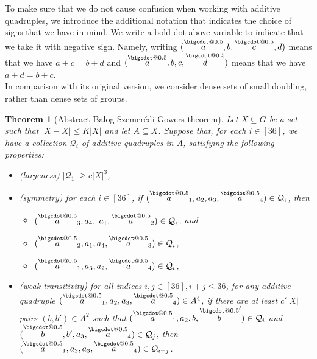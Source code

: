 \documentclass[a4paper,11pt]{article}
\makeatletter
\newtheorem{theorem}{Theorem}
\numberwithin{theorem}{section}
\theoremstyle{definition}
\newcommand*\bcdot{\mathpalette\bigcdot@{0.5}}
\newcommand*\bigcdot@[2]{\mathbin{\vcenter{\hbox{\scalebox{#2}{$\m@th#1\bullet$}}}}}
\newcommand{\upd}[1]{\overset{\bcdot}{#1}}
\makeatother
\begin{document}
To make sure that we do not cause confusion when working with additive quadruples, we introduce the additional notation that indicates the choice of signs that we have in mind. We write a bold dot above variable to indicate that we take it with negative sign. Namely, writing $(\upd{a}, b, \overset{\bcdot}{c}, d)$ means that we have $a + c = b + d$ and $(\overset{\bcdot}{a}, b, c, \overset{\bcdot}{d})$ means that we have $a + d = b + c$.\\

In comparison with its original version, we consider dense sets of small doubling, rather than dense sets of groups. 

\begin{theorem}[Abstract Balog-Szemer\'edi-Gowers theorem]\label{absg}
    \indent Let $X \subseteq G$ be a set such that $|X - X| \leq K|X|$ and let $A \subseteq X$. Suppose that, for each $i \in [36]$, we have a collection $\mathcal{Q}_i$ of additive quadruples in $A$, satisfying the following properties:
    \begin{itemize}
    \item[\textbf{(i)}] (largeness) $|\mathcal{Q}_1| \geq c |X|^3$,
    \item[\textbf{(ii)}] (symmetry) for each $i\in [36]$, if $(\upd a_1, a_2, a_3, \upd a_4) \in \mathcal{Q}_i$, then 
    \begin{itemize}
        \item[\textbf{(S1)}] $(\upd a_3,a_4,$ $ a_1, \upd a_2) \in \mathcal{Q}_i$, and
        \item[\textbf{(S2)}] $(\upd a_2, a_1, a_4, \upd a_3) \in \mathcal{Q}_i$,
        \item[\textbf{(S3)}] $(\upd a_1, a_3, a_2, \upd a_4) \in \mathcal{Q}_i$,
    \end{itemize} 
    \item[\textbf{(iii)}] (weak transitivity) for all indices $i, j \in [36], i + j \leq 36$, for any additive quadruple $(\upd a_1, a_2, a_3, \upd a_4) \in A^4$, if there are at least $c' |X|$ pairs $(b, b') \in A^2$ such that $(\upd a_1, a_2, b, \upd b') \in \mathcal{Q}_i$ and $(\upd b, b', a_3, \upd a_4) \in \mathcal{Q}_j$, then $(\upd a_1, a_2, a_3, \upd a_4) \in \mathcal{Q}_{i+j}$.
    \end{itemize}


\end{theorem}
\end{document}
